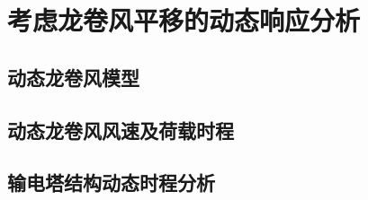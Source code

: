 \graphicspath{{figures/dynamic/}}

\chapter{考虑龙卷风平移的动态响应分析}

\section{动态龙卷风模型}

\section{动态龙卷风风速及荷载时程}

\section{输电塔结构动态时程分析}


